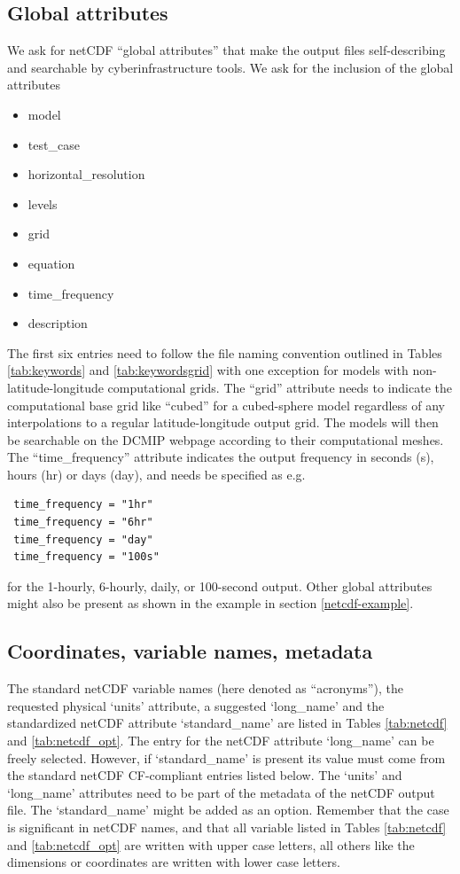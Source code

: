 \documentclass[times,doublespace]{fldauth}
\begin{document}
{\begin{appendix}
\subsection{Global attributes}
We ask for netCDF ``global attributes'' that make the output files self-describing and searchable by cyberinfrastructure tools. We ask for the inclusion of the global attributes
\begin{itemize}
\item model
\item test\_case
\item horizontal\_resolution
\item levels
\item grid
\item equation
\item time\_frequency
\item description
\end{itemize}
The first six entries need to follow the file naming convention outlined in Tables \ref{tab:keywords} and \ref{tab:keywordsgrid} with one exception for models with non-latitude-longitude computational grids. The ``grid'' attribute needs to indicate the computational base grid like ``cubed'' for a cubed-sphere model regardless of any interpolations to a regular latitude-longitude output grid. The models will then be searchable on the DCMIP webpage according to their computational meshes.
The ``time\_frequency'' attribute indicates the output frequency in seconds (s), hours (hr) or days (day), and needs be specified as e.g.
\begin{verbatim}
 time_frequency = "1hr"
 time_frequency = "6hr"
 time_frequency = "day"
 time_frequency = "100s"
 \end{verbatim}
for the 1-hourly, 6-hourly, daily, or 100-second output.  Other global attributes might also be present as shown in the example in section \ref{netcdf-example}.

\subsection{Coordinates, variable names, metadata}
The standard netCDF variable names (here denoted as ``acronyms''), the requested physical `units' attribute, a suggested `long\_name' and the standardized netCDF attribute `standard\_name' are listed in Tables \ref{tab:netcdf} and \ref{tab:netcdf_opt}. The entry for the netCDF attribute `long\_name' can be freely selected. However, if `standard\_name' is present its value must come from the standard netCDF  CF-compliant entries listed below. The `units' and `long\_name' attributes need to be part of the metadata of the netCDF output file. The `standard\_name' might be added as an option.
Remember that the case is significant in netCDF names, and that all variable listed in Tables \ref{tab:netcdf} and \ref{tab:netcdf_opt} are written with upper case letters, all others like the dimensions or coordinates are written with lower case letters.


\end{appendix}}
\end{document}
